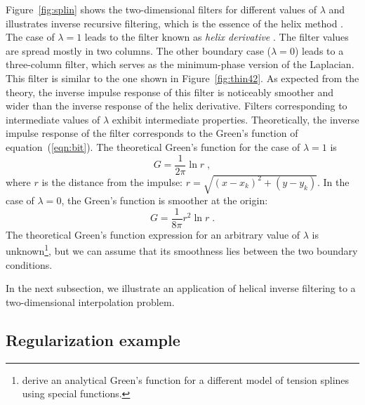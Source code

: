
\par
Figure~\ref{fig:splin} shows the two-dimensional filters for different
values of $\lambda$ and illustrates inverse recursive filtering, which
is the essence of the helix method \cite[]{GEO63-05-15321541}. The case of
$\lambda=1$ leads to the filter known as \emph{helix derivative}
\cite[]{iee}.  The filter values are spread mostly in two columns. The
other boundary case ($\lambda=0$) leads to a three-column filter,
which serves as the minimum-phase version of the Laplacian. This
filter is similar to the one shown in Figure~\ref{fig:thin42}.  As
expected from the theory, the inverse impulse response of this filter
is noticeably smoother and wider than the inverse response of the
helix derivative.  Filters corresponding to intermediate values of
$\lambda$ exhibit intermediate properties.  Theoretically, the inverse
impulse response of the filter corresponds to the Green's function of
equation~(\ref{eqn:bit}). The theoretical Green's function for the
case of $\lambda=1$ is
\begin{equation}
  \label{eqn:g1}
  G = \frac{1}{2\pi}\ln{r}\;,
\end{equation}
where $r$ is the distance from the impulse:
$r=\sqrt{\left(x-x_k\right)^2 + \left(y-y_k\right)}$. In the case of
$\lambda=0$, the Green's function is smoother at the origin:
\begin{equation}
  \label{eqn:g2}
  G = \frac{1}{8\pi}r^2\ln{r}\;.
\end{equation}
The theoretical Green's function expression for an arbitrary value of
$\lambda$ is unknown\footnote{\cite{mitas} derive an analytical Green's
  function for a different model of tension splines using special functions.}, 
but we can assume that its smoothness lies
between the two boundary conditions.
\par
In the next subsection, we illustrate an application of helical inverse
filtering to a two-dimensional interpolation problem.

\subsection{Regularization example}

